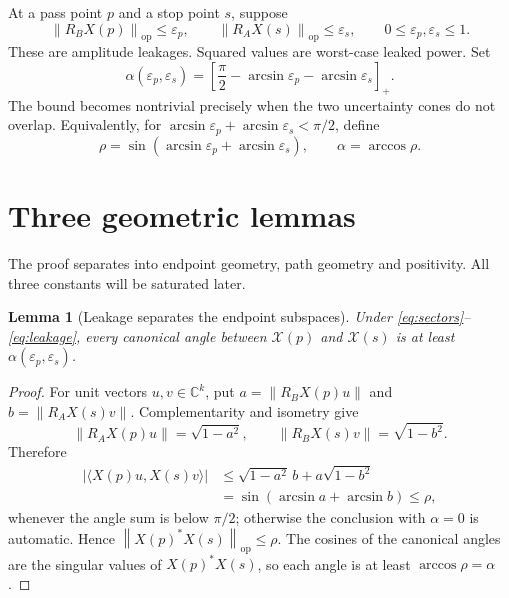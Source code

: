 \documentclass[11pt]{article}
\newtheorem{lemma}[theorem]{Lemma}
\theoremstyle{definition}
\theoremstyle{remark}
\newcommand{\C}{\mathbb{C}}
\newcommand{\onorm}[1]{\left\lVert#1\right\rVert_{\mathrm{op}}}
\begin{document}
At a pass point $p$ and a stop point $s$, suppose
\begin{equation}\label{eq:leakage}
 \onorm{R_BX(p)}\leq\varepsilon_p,
 \qquad
 \onorm{R_AX(s)}\leq\varepsilon_s,
 \qquad 0\leq\varepsilon_p,\varepsilon_s\leq1.
\end{equation}
These are amplitude leakages.  Squared values are worst-case leaked power.
Set
\begin{equation}\label{eq:alpha}
 \alpha(\varepsilon_p,\varepsilon_s)
 =\left[\frac{\pi}{2}-\arcsin\varepsilon_p
                       -\arcsin\varepsilon_s\right]_+.
\end{equation}
The bound becomes nontrivial precisely when the two uncertainty cones do
not overlap.  Equivalently, for
$\arcsin\varepsilon_p+\arcsin\varepsilon_s<\pi/2$, define
\begin{equation}\label{eq:rho}
 \rho=\sin(\arcsin\varepsilon_p+\arcsin\varepsilon_s),
 \qquad \alpha=\arccos\rho.
\end{equation}

\section{Three geometric lemmas}

The proof separates into endpoint geometry, path geometry and positivity.
All three constants will be saturated later.

\begin{lemma}[Leakage separates the endpoint subspaces]\label{lem:overlap}
Under \eqref{eq:sectors}--\eqref{eq:leakage}, every canonical angle between
$\mathcal X(p)$ and $\mathcal X(s)$ is at least
$\alpha(\varepsilon_p,\varepsilon_s)$.
\end{lemma}

\begin{proof}
For unit vectors $u,v\in\C^k$, put
$a=\|R_BX(p)u\|$ and $b=\|R_AX(s)v\|$.  Complementarity and isometry give
\[
 \|R_AX(p)u\|=\sqrt{1-a^2},
 \qquad
 \|R_BX(s)v\|=\sqrt{1-b^2}.
\]
Therefore
\begin{align*}
 |\langle X(p)u,X(s)v\rangle|
 &\leq \sqrt{1-a^2}\,b+a\sqrt{1-b^2}\\
 &=\sin(\arcsin a+\arcsin b)\leq\rho,
\end{align*}
whenever the angle sum is below $\pi/2$; otherwise the conclusion with
$\alpha=0$ is automatic.  Hence
$\onorm{X(p)^*X(s)}\leq\rho$.  The cosines of the canonical angles are the
singular values of $X(p)^*X(s)$, so each angle is at least
$\arccos\rho=\alpha$.
\end{proof}
\end{document}
